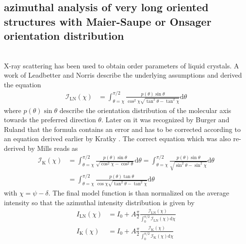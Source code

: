 \subsection{azimuthal analysis of very long oriented structures with Maier-Saupe or Onsager orientation distribution} ~\\
X-ray scattering has been used to obtain order parameters of liquid crystals. A work of Leadbetter and Norris \cite{Leadbetter1979} describe the underlying assumptions and derived the equation
\begin{align}
\mathcal{I}_\mathrm{LN}(\chi) &= \int_{\theta=\chi}^{\pi/2} \frac{p(\theta) \sin\theta}{\cos^2\chi \sqrt{\tan^2\theta-\tan^2\chi}} \mathrm{d}\theta
\end{align}
where $p(\theta) \sin\theta$ describe the orientation distribution of the molecular axis towards the preferred direction $\theta$. Later on it was recognized by Burger and Ruland \cite{Burger2006} that the formula contains an error and has to be corrected according to an equation derived earlier by Kratky \cite{Kratky1933}. The correct equation  which was also re-derived by Mills \cite{Mills2008} reads as \cite{Sims2018,Agra-Kooijman2017}
\begin{align}
\mathcal{I}_\mathrm{K}(\chi) &= \int_{\theta=\chi}^{\pi/2} \frac{p(\theta) \sin\theta}{\sqrt{\cos^2\chi-\cos^2\theta}} \mathrm{d}\theta = \int_{\theta=\chi}^{\pi/2} \frac{p(\theta) \sin\theta}{\sqrt{\sin^2\theta-\sin^2\chi}} \mathrm{d}\theta\\
&= \int_{\theta=\chi}^{\pi/2} \frac{p(\theta) \tan\theta}{\cos\chi \sqrt{\tan^2\theta-\tan^2\chi}} \mathrm{d}\theta
\end{align}
with $\chi = \psi-\delta$.  The final model function is than normalized on the average intensity so that the azimuthal intensity distribution is given by
\begin{align}
  I_\mathrm{LN}(\chi) &= I_0 + A \frac{\pi}{2}\frac{\mathcal{I}_\mathrm{LN}(\chi)}{\int_0^{\pi/2}\mathcal{I}_\mathrm{LN}(\chi)\mathrm{d}\chi} \\
  I_\mathrm{K}(\chi) &= I_0 + A \frac{\pi}{2}\frac{\mathcal{I}_\mathrm{K}(\chi)}{\int_0^{\pi/2}\mathcal{I}_\mathrm{K}(\chi)\mathrm{d}\chi}
\end{align}

